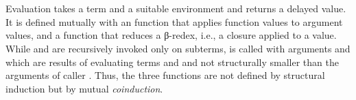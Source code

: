 \documentclass[preliminary,copyright,creativecommons]{eptcs}
\newenvironment{code}{\verbatim}{\endverbatim}
\begin{document}
\begin{code}\> \<[25]\>[25]\AgdaSymbol{:} \<[28]\>[28] \AgdaSymbol{\{}  \AgdaSymbol{\}}            \<\\
\>  \<[16]\>[16]\AgdaSymbol{(} \AgdaInductiveConstructor{,} \AgdaSymbol{)} \<[25]\>[25]\AgdaSymbol{=} \<[28]\>[28]\<\\
\> \AgdaSymbol{(} \AgdaSymbol{)} \<[16]\>[16]\AgdaSymbol{(} \AgdaInductiveConstructor{,} \AgdaSymbol{)} \<[25]\>[25]\AgdaSymbol{=} \<[28]\>[28]  \<\end{code}

\noindent Evaluation  takes a term and a suitable
environment and returns a delayed value.  It is defined mutually with
an  function that applies function values to
argument values, and a function  that reduces a
β-redex, i.e., a closure applied to a value.  While
 and  are recursively invoked
only on subterms,  is called with arguments
 and  which are results of evaluating terms
 and  and not structurally smaller than the
arguments of caller .  Thus, the three functions are
not defined by structural induction but by mutual \emph{coinduction}.
\end{document}
